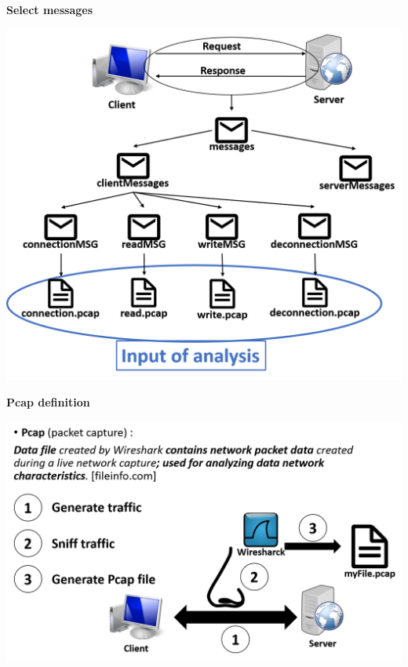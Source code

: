 \documentclass{beamer}
\newcounter{m} %
\newcounter{c} %
\begin{document}
\begin{frame}{\bf Select messages}
\begin{center}
\includegraphics[scale=0.25]{Sorting_by_type.png}
\end{center}
\end{frame}


\begin{frame}{\bf Pcap definition}
\begin{center}
\includegraphics[scale=0.30]{pcapDeffinition.png}
\end{center}
\end{frame}
\end{document}
